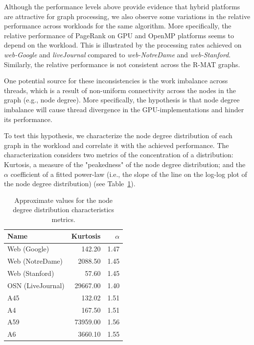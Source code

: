 Although the performance levels above provide evidence that hybrid platforms are attractive for graph processing, we also observe some variations in the relative performance across workloads for the same algorithm. More specifically, the relative performance of PageRank on GPU and OpenMP platforms seems to depend on the workload. This is illustrated by the processing rates achieved on {\em web-Google} and {\em liveJournal} compared to {\em web-NotreDame} and {\em web-Stanford}. Similarly, the relative performance is not consistent across the R-MAT graphs. 

One potential source for these inconsistencies is the work imbalance across threads, which is a result of non-uniform connectivity across the nodes in the graph (e.g., node degree). More specifically, the hypothesis is that node degree imbalance will cause thread divergence in the GPU-implementations and hinder its performance. 

To test this hypothesis, we characterize the node degree distribution of each graph in the workload and correlate it with the achieved performance. The characterization considers two metrics of the concentration of a distribution: Kurtosis, a measure of the "peakedness" of the node degree distribution; and the $\alpha$ coefficient of a fitted power-law (i.e., the slope of the line on the log-log plot of the node degree distribution) (see Table~\ref{tab:kurtosis}). 

\begin{table}[ht]
\centering
\begin{tabular}{l|r|r}
Name              & Kurtosis   & $\alpha$ \\\hline
Web (Google)      & 142.20   & 1.47    \\\hline
Web (NotreDame)   & 2088.50  & 1.45    \\\hline
Web (Stanford)    & 57.60    & 1.45    \\\hline
OSN (LiveJournal) & 29667.00 & 1.40    \\\hline
A45               & 132.02  & 1.51    \\\hline
A4                & 167.50   & 1.51    \\\hline
A59               & 73959.00 & 1.56    \\\hline
A6                & 3660.10  & 1.55     \\\hline
\end{tabular}
\caption{Approximate values for the node degree distribution characteristics metrics.}
\label{tab:kurtosis}
\end{table}
            
